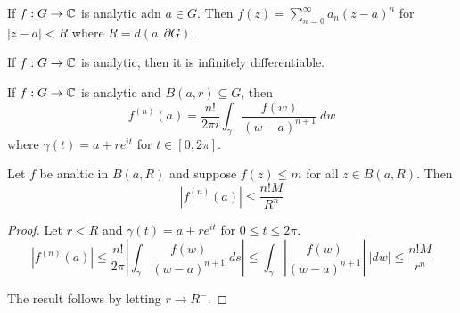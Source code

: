 \begin{corollary}
    If $f: G\to\mathbb{C}$ is analytic adn $a\in G$. Then $f(z) = \sum\limits_{n = 0}^\infty a_n (z - a)^n$ for $|z - a| < R$ where $R = d(a,\partial G)$.
\end{corollary}

\begin{corollary}
    If $f: G\to\mathbb{C}$ is analytic, then it is infinitely differentiable.
\end{corollary}

\begin{corollary}
    If $f: G\to\mathbb{C}$ is analytic and $\overline B(a,r)\subseteq G$, then 
    \begin{equation*}
        f^{(n)}(a) = \frac{n!}{2\pi i}\int_\gamma\frac{f(w)}{(w - a)^{n + 1}}~dw
    \end{equation*}
    where $\gamma(t) = a + re^{it}$ for $t\in[0,2\pi]$.
\end{corollary}

\begin{proposition}
    Let $f$ be analtic in $B(a,R)$ and suppose $f(z)\le m$ for all $z\in B(a,R)$. Then 
    \begin{equation*}
        |f^{(n)}(a)|\le\frac{n!M}{R^n}
    \end{equation*}
\end{proposition}
\begin{proof}
    Let $r < R$ and $\gamma(t) = a + re^{it}$ for $0\le t\le 2\pi$.
    \begin{equation*}
        |f^{(n)}(a)|\le\frac{n!}{2\pi}\left|\int_\gamma\frac{f(w)}{(w - a)^{n + 1}}~ds\right|\le\int_\gamma\left|\frac{f(w)}{(w - a)^{n + 1}}\right|~|dw|\le\frac{n!M}{r^n}
    \end{equation*}

    The result follows by letting $r\to R^{-}$.
\end{proof}

